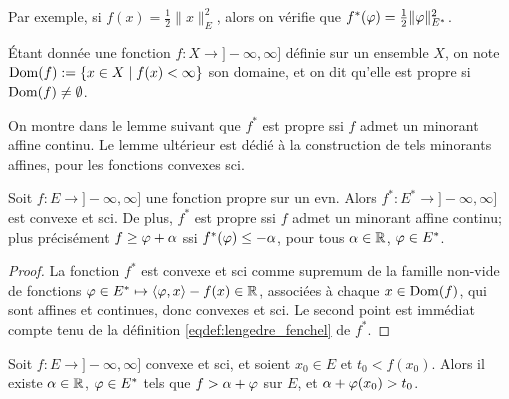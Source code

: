 Par exemple, si $f(x) = \frac 1 2 \|x\|^2_E$, alors on vérifie que $f^*(\varphi) = \frac 1 2 \|\varphi\|_{E^*}^2$. 

\begin{definition}
\label{def:domaineFct}
%
	Étant donnée une fonction $f : X \to ]-\infty,\infty]$ définie sur un ensemble $X$, on note $\operatorname{Dom}(f) := \{x \in X \mid f(x) < \infty\}$ son domaine, et on dit qu'elle est propre si $\operatorname{Dom}(f) \neq \emptyset$. 
\end{definition}


On montre dans le lemme suivant que $f^*$ est propre ssi $f$ admet un minorant affine continu. Le lemme ultérieur est dédié à la construction de tels minorants affines, pour les fonctions convexes sci.


\begin{lemma}
\label{lem:FenchelPropre}
%
	Soit $f : E \to ]-\infty,\infty]$ une fonction propre sur un evn. Alors  $f^* : E^* \to ]-\infty,\infty]$ est convexe et sci. De plus, $f^*$ est propre ssi $f$ admet un minorant affine continu; plus précisément $f \geq \varphi + \alpha$ ssi $f^*(\varphi) \leq -\alpha$, pour tous $\alpha \in \mathbb{R}$, $\varphi \in E^*$.
\end{lemma}

\begin{proof}
	La fonction $f^*$ est convexe et sci comme supremum de la famille non-vide de fonctions $\varphi \in E^* \mapsto \langle\varphi,x\rangle - f(x) \in \mathbb{R}$, associées à chaque $x \in \operatorname{Dom}(f)$, qui sont affines et continues, donc convexes et sci. Le second point est immédiat compte tenu de la définition \eqref{eqdef:lengedre_fenchel} de $f^*$.
\end{proof}

\begin{lemma}
\label{lem:minorantCvxSci}
%
	Soit $f : E \to ]-\infty,\infty]$ convexe et sci, et soient $x_0 \in E$ et $t_0 < f(x_0)$. Alors il existe $\alpha \in \mathbb{R}$, $\varphi \in E^*$ tels que $f > \alpha + \varphi$ sur $E$, et $\alpha + \varphi(x_0) > t_0$. 
\end{lemma}

